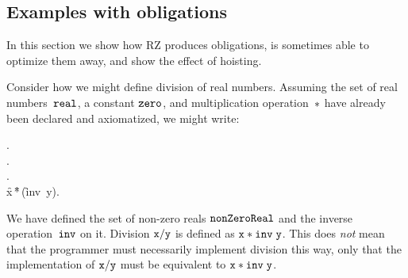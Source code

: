 \subsection{Examples with obligations}
\label{sec:exampl-with-oblig}

In this section we show how RZ produces obligations, is sometimes able
to optimize them away, and show the effect of hoisting.

Consider how we might define division of real numbers. Assuming the
set of real numbers~$\mathtt{real}$, a constant $\mathtt{zero}$, and
multiplication operation~$\mathtt{*}$ have already been declared and
axiomatized, we might write:
%
\begin{showInputSmall}
.\\
.\\
.\\
 {\f{x}\,\f{*}\,(\f{inv\ y})}.\\
\end{showInputSmall}
%
We have defined the set of non-zero reals $\mathtt{nonZeroReal}$ and
the inverse operation~$\mathtt{inv}$ on it. Division $\mathtt{x/y}$ is defined
as $\mathtt{x * inv\; y}$. This does \emph{not} mean that the
programmer must necessarily implement division this way, only that the
implementation of $\mathtt{x/y}$ must be equivalent to $\mathtt{x * inv\;y}$.

